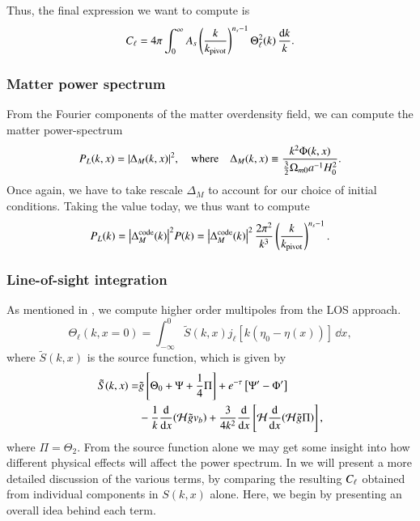 Thus, the final expression we want to compute is 
\begin{equation}
    C_\ell = 4\pi \int_0^\infty A_s \left( \frac{k}{k_\mathrm{pivot}} \right)^{n_s-1} \Theta_\ell^2(k) \, \frac{\dd k}{k}.
\end{equation}

\subsubsection{Matter power spectrum} \label{sssec:M4:theory:matter_power_spectrum}
From the Fourier components of the matter overdensity field, we can compute the matter power-spectrum
\begin{equation}
    P_L(k,x) = \abs{\Delta_M(k,x)}^2,\quad \text{where}\quad \Delta_M(k,x) \equiv \frac{k^2 \Phi(k,x)}{\frac{3}{2}\Omega_{m0} a^{-1} H_0^2}.
\end{equation}
Once again, we have to take rescale $\Delta_M$ to account for our choice of initial conditions. Taking the value today, we thus want to compute 
\begin{equation}
    P_L(k) = \abs{\Delta_M^\mathrm{code}(k)}^2 P(k) = \abs{\Delta_M^\mathrm{code}(k)}^2\, \frac{2\pi^2}{k^3}\left( \frac{k}{k_\mathrm{pivot}} \right)^{n_s-1}.
\end{equation}


\subsubsection{Line-of-sight integration}\label{sssec:M4:theory:line_of_sight_integration}
As mentioned in , we compute higher order multipoles from the LOS approach. 
\begin{equation} \label{eq:M4:theory:Theta_ell_LOS_integration}
    \Theta_\ell(k,x=0) = \int_{-\infty}^0 \tilde{S}(k,x) j_\ell [k(\eta_0 - \eta(x))]\,\dd x, 
\end{equation}
where $\tilde{S}(k,x)$ is the source function, which is given by 
\begin{equation} \label{eq:M4:theory:source_function_LOS}
    \begin{split}
        \tilde{S}(k,x) =& \tilde{g} \left[ \Theta_0 + \Psi + \frac{1}{4} \Pi \right] + e^{-\tau}\left[ \Psi' - \Phi' \right] \\
        & - \frac{1}{k}\dv{x}(\mathcal{H} \tilde{g} v_b) + \frac{3}{4k^2}\dv{x}\left[ \mathcal{H} \dv{x}(\mathcal{H}\tilde{g}\Pi) \right],
    \end{split}
\end{equation}
where $\Pi=\Theta_2$. From the source function alone we may get some insight into how different physical effects will affect the power spectrum. In  we will present a more detailed discussion of the various terms, by comparing the resulting $C_\ell$ obtained from individual components in $S(k,x)$ alone. Here, we begin by presenting an overall idea behind each term.  

